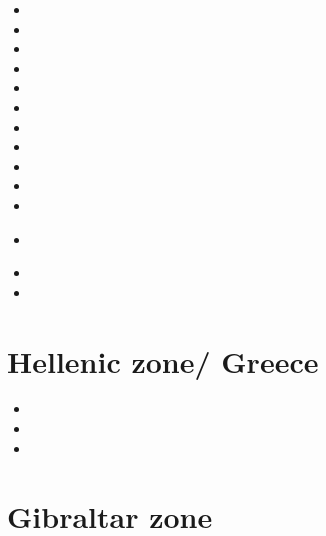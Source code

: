 \begin{scriptsize}
\begin{itemize}
\item[\nineteeneightyeight] 
\item[\nineteenninetysix] 
\item[\nineteenninetyeight] 
\item[\nineteenninetynine] 
\item[\twothousand] 
\item[\twothousandthree] 
\item[\twothousandfour] 
\item[\twothousandeight] 
\item[\twothousandnine] 
\item[\twothousandeleven] 
\item[\twothousandtwelve] 
\item[\twothousandthirteen] 
 \\ 
\item[\twothousandnineteen] 
\item[\twothousandtwenty] 
\end{itemize}
\end{scriptsize}

\section{Hellenic zone/ Greece}

\begin{scriptsize}
\begin{itemize}
\item[\nineteeneightyeight] 
\item[\twothousandthirteen]
\item[\twothousandfourteen]
\end{itemize}
\end{scriptsize}

\section{Gibraltar zone}

